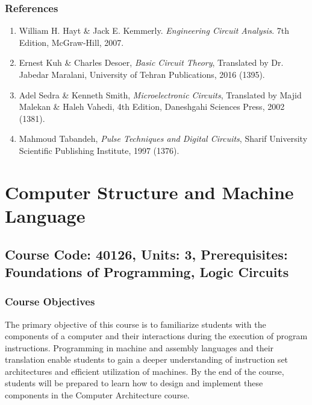 \documentclass[12pt]{article}
\begin{document}
\subsubsection*{References}
\begin{enumerate}
    \item William H. Hayt \& Jack E. Kemmerly. \textit{Engineering Circuit Analysis}. 7th Edition, McGraw-Hill, 2007.
    \item Ernest Kuh \& Charles Desoer, \textit{Basic Circuit Theory}, Translated by Dr. Jabedar Maralani, University of Tehran Publications, 2016 (1395).
    \item Adel Sedra \& Kenneth Smith, \textit{Microelectronic Circuits}, Translated by Majid Malekan \& Haleh Vahedi, 4th Edition, Daneshgahi Sciences Press, 2002 (1381).
    \item Mahmoud Tabandeh, \textit{Pulse Techniques and Digital Circuits}, Sharif University Scientific Publishing Institute, 1997 (1376).
\end{enumerate}

\newpage

\section{Computer Structure and Machine Language}
\subsection*{Course Code: 40126, Units: 3, Prerequisites: Foundations of Programming, Logic Circuits}

\subsubsection*{Course Objectives}
The primary objective of this course is to familiarize students with the components of a computer and their interactions during the execution of program instructions. Programming in machine and assembly languages and their translation enable students to gain a deeper understanding of instruction set architectures and efficient utilization of machines. By the end of the course, students will be prepared to learn how to design and implement these components in the Computer Architecture course.
\end{document}
